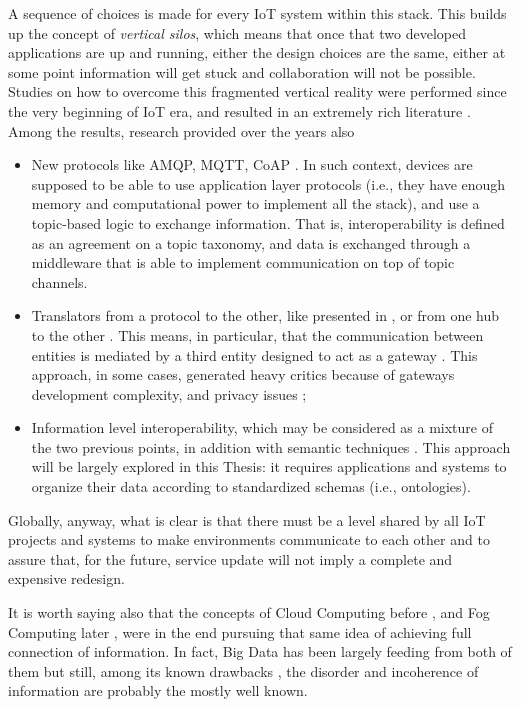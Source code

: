 A sequence of choices is made for every IoT system within this stack. This builds up the concept of \textit{vertical silos}, which means that once that two developed applications are up and running, either the design choices are the same, either at some point information will get stuck and collaboration will not be possible. Studies on how to overcome this fragmented vertical reality were performed since the very beginning of IoT era, and resulted in an extremely rich literature \cite{mora2018collaborative, bandyopadhyay2011role}. Among the results, research provided over the years also
\begin{itemize}
\item New protocols like AMQP, MQTT, CoAP \cite{soni2017survey, yassein2016application}. In such context, devices are supposed to be able to use application layer protocols (i.e., they have enough memory and computational power to implement all the stack), and use a topic-based logic to exchange information. That is, interoperability is defined as an agreement on a topic taxonomy, and data is exchanged through a middleware that is able to implement communication on top of topic channels.
\item Translators from a protocol to the other, like presented in \cite{derhamy2017iot, palavras2018semibiot}, or from one hub to the other \cite{blackstock2014iot}. This means, in particular, that the communication between entities is mediated by a third entity designed to act as a gateway \cite{vivek2015enabling, aloi2016mobile}. This approach, in some cases, generated heavy critics because of gateways development complexity, and privacy issues \cite{zachariah2015internet};
\item Information level interoperability, which may be considered as a mixture of the two previous points, in addition with semantic techniques \cite{desai2015semantic, broring2018big, ganzha2018towards, antunes2018towards}. This approach will be largely explored in this Thesis: it requires applications and systems to organize their data according to standardized schemas (i.e., ontologies). 
\end{itemize}

Globally, anyway, what is clear is that there must be a level shared by all IoT projects and systems to make environments communicate to each other and to assure that, for the future, service update will not imply a complete and expensive redesign. 

It is worth saying also that the concepts of Cloud Computing before \cite{josep2010view}, and Fog Computing later \cite{bonomi2012fog}, were in the end pursuing that same idea of achieving full connection of information. In fact, Big Data \cite{oussous2018big} has been largely feeding from both of them but still, among its known drawbacks \cite{kaisler2013big, gudivada2015big}, the disorder and incoherence of information are probably the mostly well known.


